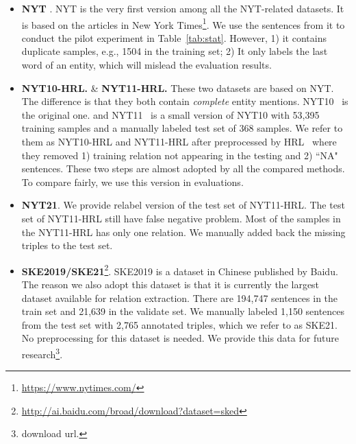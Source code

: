 \documentclass[11pt,a4paper]{article}
\begin{document}
\begin{itemize}
    \normalsize
    \item \textbf{NYT} \cite{Riedel2010ModelingRA}. 
    NYT is the very first version among all the NYT-related datasets.
    It is based on the articles in New York Times\footnote{\url{https://www.nytimes.com/}}. 
    We use the sentences from it to conduct the pilot experiment in Table~\ref{tab:stat}.
    However, 1) it contains duplicate samples, e.g., 1504 in the training set; 2) It only labels the last word of an entity, which will mislead the evaluation results.
    \item \textbf{NYT10-HRL.} \& \textbf{NYT11-HRL.}
    These two datasets are based on NYT. 
    The difference is that they both contain \textit{complete} entity mentions.
    NYT10~\cite{Riedel2010ModelingRA} is the original one.
    and NYT11~\cite{Hoffmann2011KnowledgeBasedWS} is a small version of NYT10 with 53,395 training samples and a manually labeled test set of 368 samples.
    We refer to them as NYT10-HRL and NYT11-HRL after preprocessed by HRL~\cite{Takanobu2019AHF} where they removed 1) training relation not appearing in the testing and 2) ``NA" sentences.
    These two steps are almost adopted by all the compared methods.
    To compare fairly, we use this version in evaluations.

    \item \textbf{NYT21}. We provide relabel version of the test set of NYT11-HRL. 
    The test set of NYT11-HRL still have false negative problem.
    Most of the samples in the NYT11-HRL has only one relation. 
    We manually added back the missing triples to the test set.
    
    \item \textbf{SKE2019/SKE21}\footnote{\url{http://ai.baidu.com/broad/download?dataset=sked}}.
    SKE2019 is a dataset in Chinese published by Baidu.
    The reason we also adopt this dataset is that it is currently the largest dataset available for relation extraction.
    There are 194,747 sentences in the train set and 21,639 in the validate set.
    We manually labeled 1,150 sentences from the test set with 2,765 annotated triples, which we refer to as SKE21. 
    No preprocessing for this dataset is needed.
    We provide this data for future research\footnote{download url.}.
\end{itemize}
\end{document}
